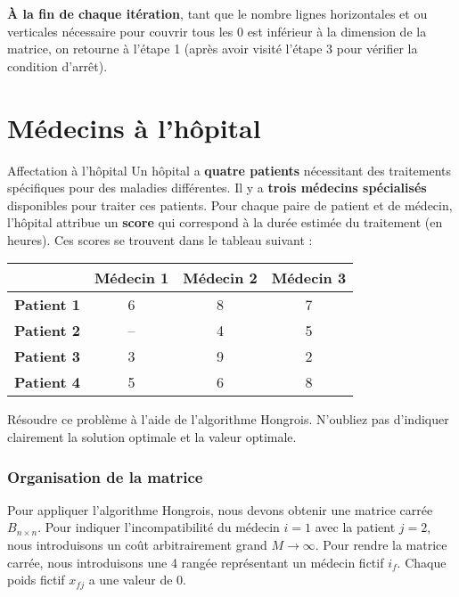 \documentclass{report}
\begin{document}
\begin{multicols*}{2}
\textbf{À la fin de chaque itération}, 
tant que le nombre lignes horizontales et ou verticales 
nécessaire pour couvrir tous les 0 est inférieur à la dimension de la matrice, 
on retourne à l'étape 1 (après avoir visité l'étape 3 pour vérifier la condition d'arrêt).
\newpage

\chapter{Médecins à l'hôpital}
    \begin{Exercice}{Affectation à l'hôpital}{}
        Un hôpital a \textbf{quatre patients}  nécessitant des traitements spécifiques pour des 
        maladies différentes. Il y a \textbf{trois médecins spécialisés }  disponibles 
        pour traiter ces patients. Pour chaque paire de patient et de médecin, 
        l’hôpital attribue un \textbf{score}  qui correspond à la durée estimée 
        du traitement (en heures). Ces scores se trouvent dans le tableau suivant :

        \vspace{1em}

        \begin{table}[H]
        \centering
        \begin{tabular}{lccc}
            \toprule
            & \textbf{Médecin 1} & \textbf{Médecin 2} & \textbf{Médecin 3} \\
            \midrule
            \textbf{Patient 1} & 6 & 8 & 7 \\
            \textbf{Patient 2} & -- & 4 & 5 \\
            \textbf{Patient 3} & 3 & 9 & 2 \\
            \textbf{Patient 4} & 5 & 6 & 8 \\
            \bottomrule
        \end{tabular}
\end{table}
        Résoudre ce problème à l’aide de l’algorithme Hongrois. 
        N’oubliez pas d’indiquer clairement la solution optimale et la valeur optimale.
    \end{Exercice}

    \subsection{Organisation de la matrice}
    Pour appliquer l'algorithme Hongrois, nous devons obtenir 
    une matrice carrée $B_{n \times n}$. Pour indiquer 
    l'incompatibilité du médecin $i = 1$ avec la patient $j = 2$, 
    nous introduisons un coût arbitrairement grand $M \rightarrow \infty$. 
    Pour rendre la matrice carrée, nous introduisons une 4 rangée 
    représentant un médecin fictif $i_f$. Chaque 
    poids fictif $x_{fj}$ a une valeur de $0$. 



\end{multicols*}
\end{document}
